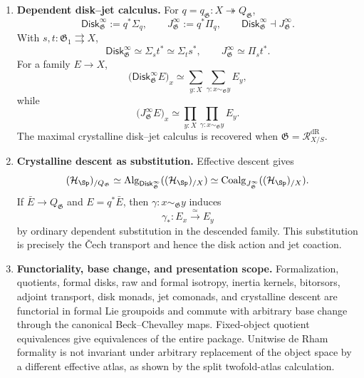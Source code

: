 \begin{theorem}
\begin{enumerate}
    \item \textbf{Dependent disk--jet calculus.}
    For
    $q=q_{\mathfrak G}:X\twoheadrightarrow Q_{\mathfrak G}$,
    \[
        \mathsf{Disk}^{\infty}_{\mathfrak G}
        :=
        q^*\Sigma_q,
        \qquad
        J^\infty_{\mathfrak G}
        :=
        q^*\Pi_q,
        \qquad
        \mathsf{Disk}^{\infty}_{\mathfrak G}\dashv J^\infty_{\mathfrak G}.
    \]
    With $s,t:\mathfrak G_1\rightrightarrows X$,
    \[
        \mathsf{Disk}^{\infty}_{\mathfrak G}
        \simeq
        \Sigma_s t^*
        \simeq
        \Sigma_t s^*,
        \qquad
        J^\infty_{\mathfrak G}
        \simeq
        \Pi_s t^*.
    \]
    For a family $E\to X$,
    \[
        \bigl(\mathsf{Disk}^{\infty}_{\mathfrak G}E\bigr)_x
        \simeq
        \sum_{y:X}
        \sum_{\gamma:x\sim_{\mathfrak G}y}
        E_y,
    \]
    while
    \[
        \bigl(J^\infty_{\mathfrak G}E\bigr)_x
        \simeq
        \prod_{y:X}
        \prod_{\gamma:x\sim_{\mathfrak G}y}
        E_y.
    \]
    The maximal crystalline disk--jet calculus is recovered when
    $\mathfrak G=\mathcal R^{\mathrm{dR}}_{X/S}$.

    \item \textbf{Crystalline descent as substitution.}
    Effective descent gives
    \[
        (\mathcal H_{\Sp})_{/Q_{\mathfrak G}}
        \simeq
        \operatorname{Alg}_{\mathsf{Disk}^{\infty}_{\mathfrak G}}
        ((\mathcal H_{\Sp})_{/X})
        \simeq
        \operatorname{Coalg}_{J^\infty_{\mathfrak G}}
        ((\mathcal H_{\Sp})_{/X}).
    \]
    If $\bar E\to Q_{\mathfrak G}$ and $E=q^*\bar E$, then
    $\gamma:x\sim_{\mathfrak G}y$ induces
    \[
        \gamma_*:E_x\xrightarrow{\simeq}E_y
    \]
    by ordinary dependent substitution in the descended family.  This
    substitution is precisely the \v{C}ech transport and hence the disk
    action and jet coaction.

    \item \textbf{Functoriality, base change, and presentation scope.}
    Formalization, quotients, formal disks, raw and formal isotropy, inertia
    kernels, bitorsors, adjoint transport, disk monads, jet comonads, and
    crystalline descent are functorial in formal Lie groupoids and commute with
    arbitrary base change through the canonical Beck--Chevalley maps.
    Fixed-object quotient equivalences give equivalences of the entire
    package.  Unitwise de Rham formality is not invariant under arbitrary
    replacement of the object space by a different effective atlas, as shown
    by the split twofold-atlas calculation.


\end{enumerate}
\end{theorem}

